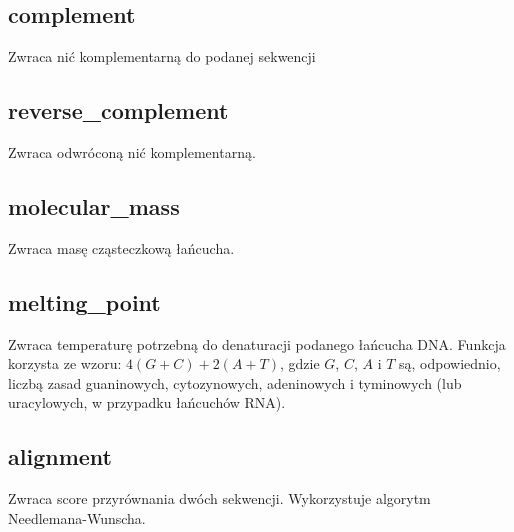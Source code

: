 \documentclass[11pt,a4paper]{mwart}
\begin{document}
		\subsection{complement}
			Zwraca nić komplementarną do podanej sekwencji
		\subsection{reverse\_complement}
			Zwraca odwróconą nić komplementarną.
		\subsection{molecular\_mass}
			Zwraca masę cząsteczkową łańcucha.
		\subsection{melting\_point}
			Zwraca temperaturę potrzebną do denaturacji podanego łańcucha DNA.
			Funkcja korzysta ze wzoru: $4(G+C)+2(A+T)$, gdzie $G$, $C$, $A$ i $T$
			są, odpowiednio, liczbą zasad guaninowych, cytozynowych, adeninowych i 
			tyminowych (lub uracylowych, w przypadku łańcuchów RNA).
		\subsection{alignment}
			Zwraca score przyrównania dwóch sekwencji. Wykorzystuje algorytm
			Needlemana-Wunscha.
\end{document}

